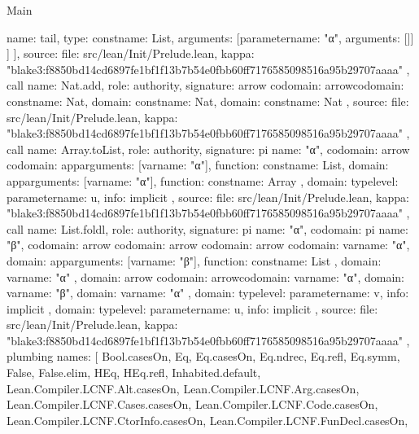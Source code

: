 \begin{lexlean}{Main}
\begin{toolingmodule}
{{{            {name: tail, type: const{name: List, arguments: [parameter{name: "α", arguments: []}]}}
          ]
        }
      ],
      source: {
        file: src/lean/Init/Prelude.lean,
        kappa: "blake3:f8850bd14cd6897fe1bf1f13b7b54e0fbb60ff7176585098516a95b29707aaaa"
      }
    },
    call{
      name: Nat.add,
      role: authority,
      signature: arrow{
        codomain: arrow{codomain: const{name: Nat}, domain: const{name: Nat}},
        domain: const{name: Nat}
      },
      source: {
        file: src/lean/Init/Prelude.lean,
        kappa: "blake3:f8850bd14cd6897fe1bf1f13b7b54e0fbb60ff7176585098516a95b29707aaaa"
      }
    },
    call{
      name: Array.toList,
      role: authority,
      signature: pi{
        name: "α",
        codomain: arrow{
          codomain: app{arguments: [var{name: "α"}], function: const{name: List}},
          domain: app{arguments: [var{name: "α"}], function: const{name: Array}}
        },
        domain: type{level: parameter{name: u}},
        info: implicit
      },
      source: {
        file: src/lean/Init/Prelude.lean,
        kappa: "blake3:f8850bd14cd6897fe1bf1f13b7b54e0fbb60ff7176585098516a95b29707aaaa"
      }
    },
    call{
      name: List.foldl,
      role: authority,
      signature: pi{
        name: "α",
        codomain: pi{
          name: "β",
          codomain: arrow{
            codomain: arrow{
              codomain: arrow{
                codomain: var{name: "α"},
                domain: app{arguments: [var{name: "β"}], function: const{name: List}}
              },
              domain: var{name: "α"}
            },
            domain: arrow{
              codomain: arrow{codomain: var{name: "α"}, domain: var{name: "β"}},
              domain: var{name: "α"}
            }
          },
          domain: type{level: parameter{name: v}},
          info: implicit
        },
        domain: type{level: parameter{name: u}},
        info: implicit
      },
      source: {
        file: src/lean/Init/Prelude.lean,
        kappa: "blake3:f8850bd14cd6897fe1bf1f13b7b54e0fbb60ff7176585098516a95b29707aaaa"
      }
    },
    plumbing{
      names: [
        Bool.casesOn,
        Eq,
        Eq.casesOn,
        Eq.ndrec,
        Eq.refl,
        Eq.symm,
        False,
        False.elim,
        HEq,
        HEq.refl,
        Inhabited.default,
        Lean.Compiler.LCNF.Alt.casesOn,
        Lean.Compiler.LCNF.Arg.casesOn,
        Lean.Compiler.LCNF.Cases.casesOn,
        Lean.Compiler.LCNF.Code.casesOn,
        Lean.Compiler.LCNF.CtorInfo.casesOn,
        Lean.Compiler.LCNF.FunDecl.casesOn,
}}
\end{toolingmodule}
\end{lexlean}
